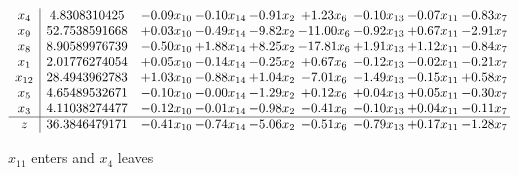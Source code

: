 \documentclass[8pt]{article}
\begin{document}
 \[\begin{array}{c| c c@{\hskip 2pt} c@{\hskip 2pt} c@{\hskip 2pt} c@{\hskip 2pt} c@{\hskip 2pt} c@{\hskip 2pt} c@{\hskip 2pt} }
 x_{4}   &  4.8308310425 & -0.09 x_{10} & -0.10 x_{14} & -0.91 x_{2} & +  1.23 x_{6} & -0.10 x_{13} & -0.07 x_{11} & -0.83 x_{7}\\
 x_{9}   &  52.7538591668 & +  0.03 x_{10} & -0.49 x_{14} & -9.82 x_{2} & -11.00 x_{6} & -0.92 x_{13} & +  0.67 x_{11} & -2.91 x_{7}\\
 x_{8}   &  8.90589976739 & -0.50 x_{10} & +  1.88 x_{14} & +  8.25 x_{2} & -17.81 x_{6} & +  1.91 x_{13} & +  1.12 x_{11} & -0.84 x_{7}\\
 x_{1}   &  2.01776274054 & +  0.05 x_{10} & -0.14 x_{14} & -0.25 x_{2} & +  0.67 x_{6} & -0.12 x_{13} & -0.02 x_{11} & -0.21 x_{7}\\
 x_{12}   &  28.4943962783 & +  1.03 x_{10} & -0.88 x_{14} & +  1.04 x_{2} & -7.01 x_{6} & -1.49 x_{13} & -0.15 x_{11} & +  0.58 x_{7}\\
 x_{5}   &  4.65489532671 & -0.10 x_{10} & -0.00 x_{14} & -1.29 x_{2} & +  0.12 x_{6} & +  0.04 x_{13} & +  0.05 x_{11} & -0.30 x_{7}\\
 x_{3}   &  4.11038274477 & -0.12 x_{10} & -0.01 x_{14} & -0.98 x_{2} & -0.41 x_{6} & -0.10 x_{13} & +  0.04 x_{11} & -0.11 x_{7}\\
\hline
z    &  36.3846479171 & -0.41 x_{10} & -0.74 x_{14} & -5.06 x_{2} & -0.51 x_{6} & -0.79 x_{13} & +  0.17 x_{11} & -1.28 x_{7}\\
\end{array}\]


 $ x_{11} $ enters and $ x_{4} $ leaves 
\end{document}
